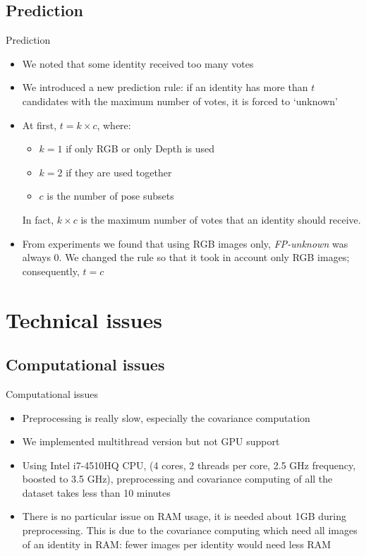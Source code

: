 \documentclass[unknownkeysallowed]{beamer}
\begin{document}
\subsection{Prediction}
\begin{frame}{Prediction}
	\begin{itemize}
		\item We noted that some identity received too many votes
		\item We introduced a new prediction rule: if an identity has
			more than $t$ candidates with the maximum number of
			votes, it is forced to `unknown'
		\item At first, $t=k \times c$, where:
			\begin{itemize}
				\item $k=1$ if only RGB or
					only Depth is used
				\item $k=2$ if they are used together
				\item $c$ is the number of pose subsets
			\end{itemize}
			In fact, $k \times c$ is the maximum number of votes
			that an identity should receive.
		\item From experiments we found that using RGB images only,
			\textit{FP-unknown} was always 0. We changed the rule
			so that it took in account only RGB images;
			consequently, $t = c$

	\end{itemize}
\end{frame}

\section{Technical issues}
\subsection{Computational issues}
\begin{frame}{Computational issues}
	\begin{itemize}
		\item Preprocessing is really slow, especially the covariance
			computation
		\item We implemented multithread version but not GPU support
		\item Using Intel i7-4510HQ CPU, (4 cores, 2 threads per core,
			2.5 GHz frequency, boosted to 3.5 GHz), preprocessing
			and covariance computing of all the dataset takes less than
			10 minutes
		\item There is no particular issue on RAM usage, it is needed
			about 1GB during preprocessing. This is due to the
			covariance computing which need all images of an
			identity in RAM: fewer images per identity would need
			less RAM
	\end{itemize}
\end{frame}
\end{document}
